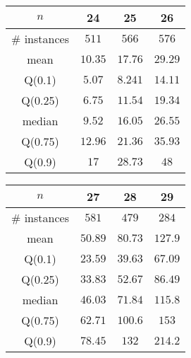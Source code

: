 \begin{tabular}{c|ccc} 
\hline 
$n$ & 24 & 25 & 26 \tabularnewline 
\hline 
\hline 
\# instances & $511$ & $566$ & $576$ \tabularnewline 
mean & $10.35$ & $17.76$ & $29.29$ \tabularnewline 
Q(0.1) & $5.07$ & $8.241$ & $14.11$ \tabularnewline 
Q(0.25) & $6.75$ & $11.54$ & $19.34$ \tabularnewline 
median & $9.52$ & $16.05$ & $26.55$ \tabularnewline 
Q(0.75) & $12.96$ & $21.36$ & $35.93$ \tabularnewline 
Q(0.9) & $17$ & $28.73$ & $48$ \tabularnewline 
\hline 
\end{tabular} 
\medskip{} 

\begin{tabular}{c|ccc} 
\hline 
$n$ & 27 & 28 & 29 \tabularnewline 
\hline 
\hline 
\# instances & $581$ & $479$ & $284$ \tabularnewline 
mean & $50.89$ & $80.73$ & $127.9$ \tabularnewline 
Q(0.1) & $23.59$ & $39.63$ & $67.09$ \tabularnewline 
Q(0.25) & $33.83$ & $52.67$ & $86.49$ \tabularnewline 
median & $46.03$ & $71.84$ & $115.8$ \tabularnewline 
Q(0.75) & $62.71$ & $100.6$ & $153$ \tabularnewline 
Q(0.9) & $78.45$ & $132$ & $214.2$ \tabularnewline 
\hline 
\end{tabular} 
\medskip{} 

